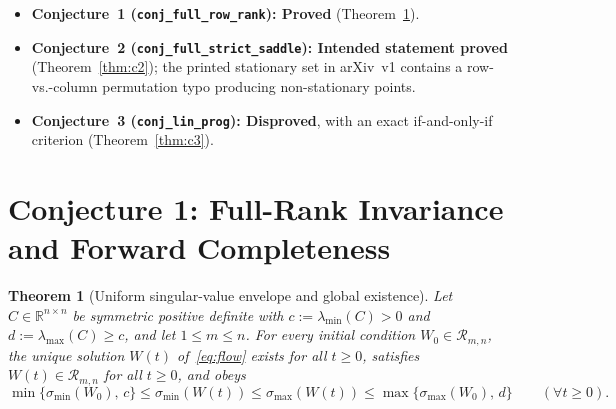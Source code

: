 \documentclass[11pt]{article}
\theoremstyle{plain}
\newtheorem{theorem}{Theorem}
\theoremstyle{definition}
\theoremstyle{remark}
\begin{document}
\begin{itemize}[leftmargin=2em,itemsep=2pt]
\item \textbf{Conjecture~1 (\texttt{conj\_full\_row\_rank}): Proved} (Theorem~\ref{thm:c1}).
\item \textbf{Conjecture~2 (\texttt{conj\_full\_strict\_saddle}): Intended statement proved} (Theorem~\ref{thm:c2}); the printed stationary set in arXiv~v1 contains a row-vs.-column permutation typo producing non-stationary points.
\item \textbf{Conjecture~3 (\texttt{conj\_lin\_prog}): Disproved}, with an exact if-and-only-if criterion (Theorem~\ref{thm:c3}).
\end{itemize}

\section{Conjecture 1: Full-Rank Invariance and Forward Completeness}

\begin{theorem}[Uniform singular-value envelope and global existence]\label{thm:c1}
Let $C \in \mathbb{R}^{n \times n}$ be symmetric positive definite with $c := \lambda_{\min}(C) > 0$ and $d := \lambda_{\max}(C) \ge c$, and let $1 \le m \le n$. For every initial condition $W_0 \in \mathcal{R}_{m,n}$, the unique solution $W(t)$ of~\eqref{eq:flow} exists for all $t \ge 0$, satisfies $W(t) \in \mathcal{R}_{m,n}$ for all $t \ge 0$, and obeys
\begin{equation}\label{eq:sv-envelope}
\min\{\sigma_{\min}(W_0),\, c\} \le \sigma_{\min}(W(t)) \le \sigma_{\max}(W(t)) \le \max\{\sigma_{\max}(W_0),\, d\}
\qquad (\forall t \ge 0).
\end{equation}
\end{theorem}
\end{document}

